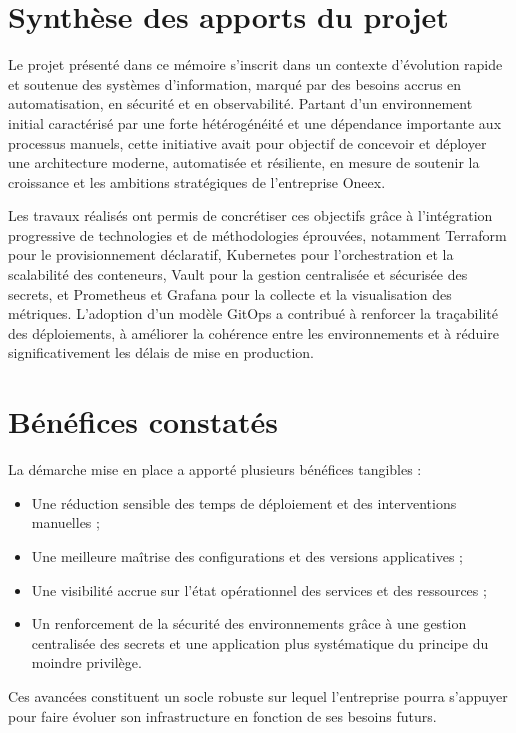 \section{Synthèse des apports du projet}

Le projet présenté dans ce mémoire s’inscrit dans un contexte d’évolution rapide et soutenue des systèmes d’information, marqué par des besoins accrus en automatisation, en sécurité et en observabilité. Partant d’un environnement initial caractérisé par une forte hétérogénéité et une dépendance importante aux processus manuels, cette initiative avait pour objectif de concevoir et déployer une architecture moderne, automatisée et résiliente, en mesure de soutenir la croissance et les ambitions stratégiques de l’entreprise Oneex.

Les travaux réalisés ont permis de concrétiser ces objectifs grâce à l’intégration progressive de technologies et de méthodologies éprouvées, notamment Terraform pour le provisionnement déclaratif, Kubernetes pour l’orchestration et la scalabilité des conteneurs, Vault pour la gestion centralisée et sécurisée des secrets, et Prometheus et Grafana pour la collecte et la visualisation des métriques. L’adoption d’un modèle GitOps a contribué à renforcer la traçabilité des déploiements, à améliorer la cohérence entre les environnements et à réduire significativement les délais de mise en production.

\section{Bénéfices constatés}

La démarche mise en place a apporté plusieurs bénéfices tangibles :
\begin{itemize}
	\item Une réduction sensible des temps de déploiement et des interventions manuelles ;
	\item Une meilleure maîtrise des configurations et des versions applicatives ;
	\item Une visibilité accrue sur l’état opérationnel des services et des ressources ;
	\item Un renforcement de la sécurité des environnements grâce à une gestion centralisée des secrets et une application plus systématique du principe du moindre privilège.
\end{itemize}
Ces avancées constituent un socle robuste sur lequel l’entreprise pourra s’appuyer pour faire évoluer son infrastructure en fonction de ses besoins futurs.

